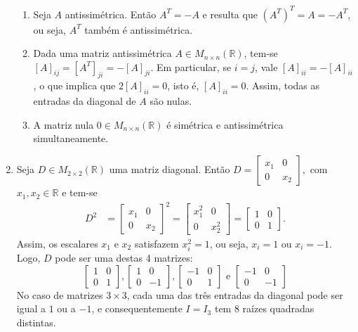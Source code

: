 \documentclass[12pt,a4paper]{article}
\newcommand*\R{\mathbb{R}}
\begin{document}
\begin{enumerate}
\begin{enumerate}
\item Seja $A$ antissimétrica. Então $A^T = -A$ e resulta que $
\left( A^T \right)^T = A = -A^T$, ou seja, $A^T$ também é antissimétrica.

\item Dada uma matriz antissimétrica $A \in M_{n \times n}(\R)$, tem-se $[A]_{ij} = [A^T]_{ji} = -[A]_{ji}$. Em particular, se $i = j$, vale $[A]_{ii} = -[A]_{ii}$, o que implica que  $2[A]_{ii} = 0$, isto é,  $[A]_{ii} = 0$. Assim, todas as entradas da diagonal de $A$ são nulas.

\item A matriz nula $0 \in M_{n \times n}(\R)$ é simétrica e antissimétrica simultaneamente.

\end{enumerate}


\item Seja $D \in M_{2\times 2} (\R)$ uma matriz diagonal. Então
$
D = \begin{bmatrix}
x_1 & 0\\
0 & x_2
\end{bmatrix},
$
com $x_1, x_2 \in \R$
e tem-se
\begin{align*}
D^2
& =
\begin{bmatrix}
x_1 & 0 \\
0 & x_2
\end{bmatrix}^2
=
\begin{bmatrix}
x_1^2 & 0 \\
0 & x_2^2
\end{bmatrix}
=
\begin{bmatrix}
1 & 0\\
0 & 1
\end{bmatrix}.
\end{align*}
Assim, os escalares $x_1$ e $x_2$ satisfazem $x_i^2 = 1$, ou seja, $x_i = 1$ ou $x_i = -1$. Logo, $D$ pode ser uma destas 4 matrizes:
\[
\begin{bmatrix}
1 & 0\\
0 & 1
\end{bmatrix},
\begin{bmatrix}
1 & 0\\
0 & -1
\end{bmatrix},
\begin{bmatrix}
-1 & 0\\
0 & 1
\end{bmatrix}
\text{ e }
\begin{bmatrix}
-1 & 0\\
0 & -1
\end{bmatrix}
\]
No caso de matrizes $3 \times 3$, cada uma das três entradas da diagonal pode ser igual a $1$ ou a $-1$, e consequentemente $I = I_3$ tem 8 raízes quadradas distintas.


\end{enumerate}
\end{document}
